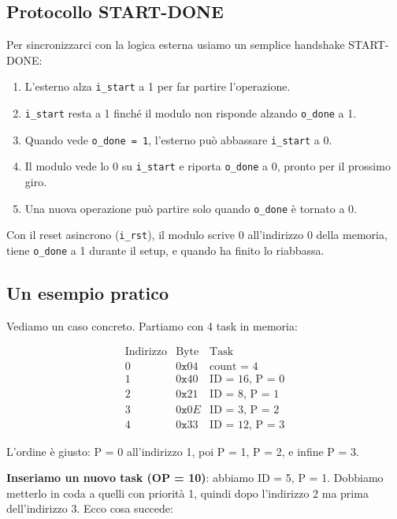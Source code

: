 \documentclass[a4paper,12pt]{article}
\begin{document}
\newpage
\subsection{Protocollo START-DONE}

Per sincronizzarci con la logica esterna usiamo un semplice handshake START-DONE:

\begin{enumerate}
    \item L'esterno alza \texttt{i\_start} a 1 per far partire l'operazione.
    \item \texttt{i\_start} resta a 1 finché il modulo non risponde alzando \texttt{o\_done} a 1.
    \item Quando vede \texttt{o\_done = 1}, l'esterno può abbassare \texttt{i\_start} a 0.
    \item Il modulo vede lo 0 su \texttt{i\_start} e riporta \texttt{o\_done} a 0, pronto per il prossimo giro.
    \item Una nuova operazione può partire solo quando \texttt{o\_done} è tornato a 0.
\end{enumerate}

Con il reset asincrono (\texttt{i\_rst}), il modulo scrive 0 all'indirizzo 0 della memoria, tiene \texttt{o\_done} a 1 durante il setup, e quando ha finito lo riabbassa.

\subsection{Un esempio pratico}

Vediamo un caso concreto. Partiamo con 4 task in memoria:

\[
\begin{array}{c|c|c}
\text{Indirizzo} & \text{Byte} & \text{Task} \\ \hline
0 & 0\texttt{x}04 & \text{count = 4} \\
1 & 0\texttt{x}40 & \text{ID = 16, P = 0} \\
2 & 0\texttt{x}21 & \text{ID = 8, P = 1}  \\
3 & 0\texttt{x}0E & \text{ID = 3, P = 2}  \\
4 & 0\texttt{x}33 & \text{ID = 12, P = 3}
\end{array}
\]

L'ordine è giusto: P = 0 all'indirizzo 1, poi P = 1, P = 2, e infine P = 3.

\textbf{Inseriamo un nuovo task (OP = 10)}: abbiamo ID = 5, P = 1. Dobbiamo metterlo in coda a quelli con priorità 1, quindi dopo l'indirizzo 2 ma prima dell'indirizzo 3. \newpage Ecco cosa succede:
\end{document}
